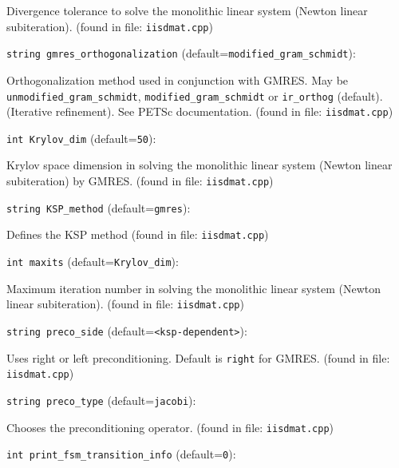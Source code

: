 Divergence tolerance to solve the monolithic linear
system (Newton linear subiteration).
 (found in file: \verb+iisdmat.cpp+)
\item\verb+string gmres_orthogonalization+ {\rm(default=\verb|modified_gram_schmidt|)}:

Orthogonalization method used in conjunction with GMRES. 
May be  {\tt unmodified\_gram\_schmidt},
 \verb+modified_gram_schmidt+  or {\tt ir\_orthog} (default). (Iterative refinement).
See PETSc documentation. 
 (found in file: \verb+iisdmat.cpp+)
\item\verb+int Krylov_dim+ {\rm(default=\verb|50|)}:

Krylov space dimension in solving the monolithic linear
system (Newton linear subiteration) by GMRES.
 (found in file: \verb+iisdmat.cpp+)
\item\verb+string KSP_method+ {\rm(default=\verb|gmres|)}:

Defines the KSP method
 (found in file: \verb+iisdmat.cpp+)
\item\verb+int maxits+ {\rm(default=\verb|Krylov_dim|)}:

Maximum iteration number in solving the monolithic linear
system (Newton linear subiteration).
 (found in file: \verb+iisdmat.cpp+)
\item\verb+string preco_side+ {\rm(default=\verb|<ksp-dependent>|)}:

Uses right or left preconditioning. Default is  \verb+right+  for
GMRES. 
 (found in file: \verb+iisdmat.cpp+)
\item\verb+string preco_type+ {\rm(default=\verb|jacobi|)}:

Chooses the preconditioning operator. 
 (found in file: \verb+iisdmat.cpp+)
\item\verb+int print_fsm_transition_info+ {\rm(default=\verb|0|)}:


